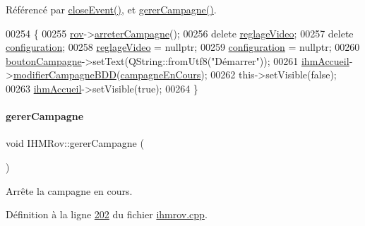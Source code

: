 Référencé par \hyperlink{ihmrov_8cpp_source_l00239}{close\+Event()}, et \hyperlink{ihmrov_8cpp_source_l00202}{gerer\+Campagne()}.


\begin{DoxyCode}
00254 \{
00255     \hyperlink{class_i_h_m_rov_a777ca33fdb295ba6b6773e880356fa1e}{rov}->\hyperlink{class_rov_ad53e8d86817c81f92e3113b0394bedc5}{arreterCampagne}();
00256     \textcolor{keyword}{delete} \hyperlink{class_i_h_m_rov_a6baa53853d29151404e6ae3dec5d2003}{reglageVideo};
00257     \textcolor{keyword}{delete} \hyperlink{class_i_h_m_rov_a29f4de081899d8830376f1ad27e74647}{configuration};
00258     \hyperlink{class_i_h_m_rov_a6baa53853d29151404e6ae3dec5d2003}{reglageVideo} = \textcolor{keyword}{nullptr};
00259     \hyperlink{class_i_h_m_rov_a29f4de081899d8830376f1ad27e74647}{configuration} = \textcolor{keyword}{nullptr};
00260     \hyperlink{class_i_h_m_rov_a324be23537f48127c49b943aa439a978}{boutonCampagne}->setText(QString::fromUtf8(\textcolor{stringliteral}{"Démarrer"}));
00261     \hyperlink{class_i_h_m_rov_aa22f6fe8daf5c67071ec02a348e5cc3e}{ihmAccueil}->\hyperlink{class_i_h_m_accueil_a7f1e5f71843a99cb44e3efb7191a6d07}{modifierCampagneBDD}(\hyperlink{class_i_h_m_rov_af0475e935531b7331f097ae13d07989b}{campagneEnCours});
00262     this->setVisible(\textcolor{keyword}{false});
00263     \hyperlink{class_i_h_m_rov_aa22f6fe8daf5c67071ec02a348e5cc3e}{ihmAccueil}->setVisible(\textcolor{keyword}{true});
00264 \}
\end{DoxyCode}
\mbox{\label{class_i_h_m_rov_a3660d3b4bf61367534eae9d0c3618a5e}} 
\paragraph{\texorpdfstring{gerer\+Campagne}{gererCampagne}}
{\footnotesize\ttfamily void I\+H\+M\+Rov\+::gerer\+Campagne (\begin{DoxyParamCaption}{ }\end{DoxyParamCaption})\hspace{0.3cm}{\ttfamily [slot]}}



Arrête la campagne en cours. 



Définition à la ligne \hyperlink{ihmrov_8cpp_source_l00202}{202} du fichier \hyperlink{ihmrov_8cpp_source}{ihmrov.\+cpp}.



